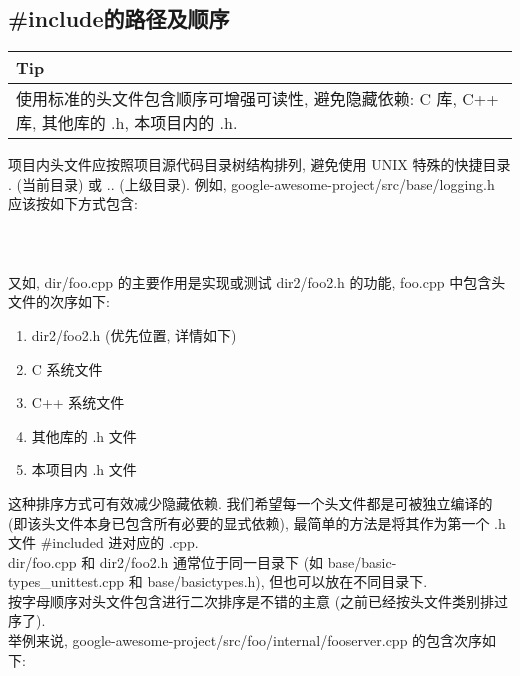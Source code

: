 \documentclass[a4paper,11pt,CJK]{article}
\begin{document}
\begin{CJK}{UTF8}{gbsn}
\subsection{ \#include的路径及顺序}
\begin{table}[htbp]
\flushleft
\begin{tabular}{p{400pt}}
\toprule
\rowcolor[gray]{.8} Tip \\
\midrule
使用标准的头文件包含顺序可增强可读性, 避免隐藏依赖: C 库, C++ 库, 其他库的 .h, 本项目内的 .h. \\
\bottomrule
\end{tabular}
\end{table}
项目内头文件应按照项目源代码目录树结构排列, 避免使用 UNIX 特殊的快捷目录 . (当前目录) 或 .. (上级目录). 例如, google-awesome-project/src/base/logging.h 应该按如下方式包含: \\
\\
\\
\\
\indent 又如, dir/foo.cpp 的主要作用是实现或测试 dir2/foo2.h 的功能, foo.cpp 中包含头文件的次序如下:
\begin{enumerate}
    \item dir2/foo2.h (优先位置, 详情如下)
    \item C 系统文件
    \item C++ 系统文件
    \item 其他库的 .h 文件
    \item 本项目内 .h 文件
\end{enumerate}

\indent 这种排序方式可有效减少隐藏依赖. 我们希望每一个头文件都是可被独立编译的 (即该头文件本身已包含所有必要的显式依赖), 最简单的方法是将其作为第一个 .h 文件 \#included 进对应的 .cpp. \\
\indent dir/foo.cpp 和 dir2/foo2.h 通常位于同一目录下 (如 base/basic-types\_unittest.cpp 和 base/basictypes.h), 但也可以放在不同目录下. \\
\indent 按字母顺序对头文件包含进行二次排序是不错的主意 (之前已经按头文件类别排过序了). \\
\indent 举例来说, google-awesome-project/src/foo/internal/fooserver.cpp 的包含次序如下: \\
\\
\\

\end{CJK}
\end{document}
